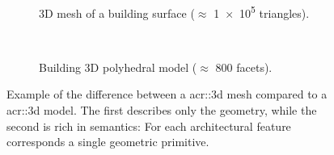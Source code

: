             \begin{figure}
                \begin{center}
                    \begin{subfigure}{\textwidth}
                        \begin{center}
                            
                            \caption{3D mesh of a building surface ($\approx$ \num[output-exponent-marker = \text{e}]{1e5} triangles).}
                        \end{center}
                    \end{subfigure}
                    \\
                    \begin{subfigure}{\textwidth}
                        \begin{center}
                            
                            \caption{Building 3D polyhedral model ($\approx$ 800 facets).}
                        \end{center}
                    \end{subfigure}
                    \caption{
                        \label{fig::3dmodel_vs_3dmesh} Example of the difference between a \gls{acr::3d} mesh compared to a \gls{acr::3d} model.
                        The first describes only the geometry, while the second is rich in semantics:
                        For each architectural feature corresponds a single geometric primitive.
                    }
                \end{center}
            \end{figure}
            
